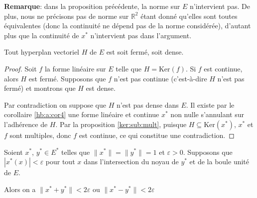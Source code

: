 \textbf{Remarque}: dans la proposition précédente, la norme sur $E$
n'intervient pas. De plus, nous ne précisons pas de norme sur $\mathbb{R}^2$
étant donné qu'elles sont toutes équivalentes (donc la continuité ne
dépend pas de la norme considérée), d'autant plus que la continuité de $x^*$
n'intervient pas dans l'argument.

\begin{prop}
  Tout hyperplan vectoriel $H$ de $E$ est soit fermé, soit dense.
\end{prop}
\begin{proof}
  Soit $f$ la forme linéaire sur $E$ telle que $H = \mathrm{Ker}(f)$.
  Si $f$ est continue, alors $H$ est fermé. Supposons que $f$ n'est
  pas continue (c'est-à-dire $H$ n'est pas fermé)
  et montrons que $H$ est dense.

  Par contradiction on suppose que $H$ n'est pas dense dans $E$.
  Il existe par   le corollaire \ref{hb:a:cor4} une forme linéaire
  et continue $x^*$ non nulle s'annulant sur l'adhérence de $H$.
  Par la proposition \ref{ker:sub:mult}, puisque
  $H\subseteq \mathrm{Ker}(x^*)$, $x^*$ et $f$ sont multiples, donc
  $f$ est continue, ce qui constitue une contradiction.
\end{proof}


\begin{prop}
  Soient $x^*$, $y^*\in E^*$ telles que $\|x^*\| = \|y^*\| = 1$ et
  $\varepsilon >0$. Supposons que $|x^*(x)| < \varepsilon$ pour tout
  $x$ dans l'intersection du noyau de $y^*$ et de la boule unité de $E$.

  Alors on a $\| x^* + y^*\| < 2\varepsilon$ ou
  $\| x^* - y^*\| < 2\varepsilon$
\end{prop}


